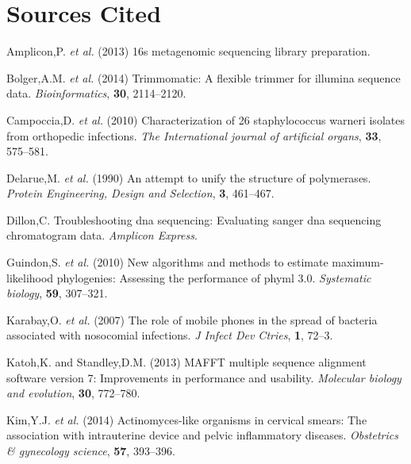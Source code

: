 \documentclass[]{article}
\begin{document}
\hypertarget{sources-cited}{%
\section*{Sources Cited}\label{sources-cited}}

\hypertarget{refs}{}
\leavevmode\hypertarget{ref-amplicon201316s}{}%
Amplicon,P. \emph{et al.} (2013) 16s metagenomic sequencing library
preparation.

\leavevmode\hypertarget{ref-bolger2014trimmomatic}{}%
Bolger,A.M. \emph{et al.} (2014) Trimmomatic: A flexible trimmer for
illumina sequence data. \emph{Bioinformatics}, \textbf{30}, 2114--2120.

\leavevmode\hypertarget{ref-campoccia2010characterization}{}%
Campoccia,D. \emph{et al.} (2010) Characterization of 26 staphylococcus
warneri isolates from orthopedic infections. \emph{The International
journal of artificial organs}, \textbf{33}, 575--581.

\leavevmode\hypertarget{ref-delarue1990attempt}{}%
Delarue,M. \emph{et al.} (1990) An attempt to unify the structure of
polymerases. \emph{Protein Engineering, Design and Selection},
\textbf{3}, 461--467.

\leavevmode\hypertarget{ref-dillon}{}%
Dillon,C. Troubleshooting dna sequencing: Evaluating sanger dna
sequencing chromatogram data. \emph{Amplicon Express}.

\leavevmode\hypertarget{ref-guindon2010new}{}%
Guindon,S. \emph{et al.} (2010) New algorithms and methods to estimate
maximum-likelihood phylogenies: Assessing the performance of phyml 3.0.
\emph{Systematic biology}, \textbf{59}, 307--321.

\leavevmode\hypertarget{ref-karabay2007role}{}%
Karabay,O. \emph{et al.} (2007) The role of mobile phones in the spread
of bacteria associated with nosocomial infections. \emph{J Infect Dev
Ctries}, \textbf{1}, 72--3.

\leavevmode\hypertarget{ref-katoh2013mafft}{}%
Katoh,K. and Standley,D.M. (2013) MAFFT multiple sequence alignment
software version 7: Improvements in performance and usability.
\emph{Molecular biology and evolution}, \textbf{30}, 772--780.

\leavevmode\hypertarget{ref-kim2014actinomyces}{}%
Kim,Y.J. \emph{et al.} (2014) Actinomyces-like organisms in cervical
smears: The association with intrauterine device and pelvic inflammatory
diseases. \emph{Obstetrics \& gynecology science}, \textbf{57},
393--396.
\end{document}
